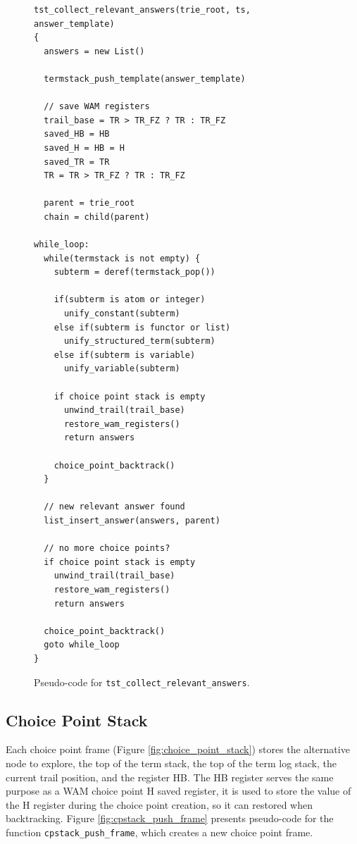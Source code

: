 \begin{figure}[ht]
\begin{Verbatim}
tst_collect_relevant_answers(trie_root, ts, answer_template)
{
  answers = new List()
  
  termstack_push_template(answer_template)
  
  // save WAM registers
  trail_base = TR > TR_FZ ? TR : TR_FZ
  saved_HB = HB
  saved_H = HB = H
  saved_TR = TR
  TR = TR > TR_FZ ? TR : TR_FZ
  
  parent = trie_root
  chain = child(parent)
  
while_loop:
  while(termstack is not empty) {
    subterm = deref(termstack_pop())
    
    if(subterm is atom or integer)
      unify_constant(subterm)
    else if(subterm is functor or list)
      unify_structured_term(subterm)
    else if(subterm is variable)
      unify_variable(subterm)
      
    if choice point stack is empty
      unwind_trail(trail_base)
      restore_wam_registers()
      return answers
    
    choice_point_backtrack()
  }
  
  // new relevant answer found
  list_insert_answer(answers, parent)
  
  // no more choice points?
  if choice point stack is empty
    unwind_trail(trail_base)
    restore_wam_registers()
    return answers
    
  choice_point_backtrack()
  goto while_loop
}
\end{Verbatim}
\caption{Pseudo-code for \texttt{tst\_collect\_relevant\_answers}.}
\label{fig:tst_collect_relevant_answers}
\end{figure}

\subsection{Choice Point Stack}

Each choice point frame (Figure \ref{fig:choice_point_stack}) stores the alternative node to explore, the top of the term stack, the top of the term log stack, the current trail position, and the register HB. The HB register serves the same purpose as a WAM choice point H saved register, it is used to store the value of the H register during the choice point creation, so it can restored when backtracking. Figure \ref{fig:cpstack_push_frame} presents pseudo-code for the function \texttt{cpstack\_push\_frame}, which creates a new choice point frame.

